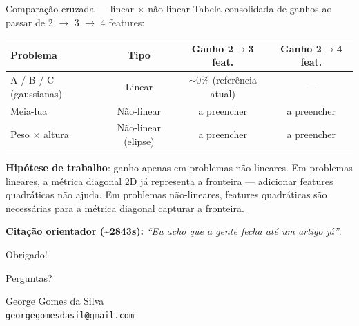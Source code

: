 \documentclass[aspectratio=169,10pt]{beamer}
\begin{document}
\begin{frame}{Compara\c{c}\~ao cruzada --- linear $\times$ n\~ao-linear}
  \footnotesize
  Tabela consolidada de ganhos ao passar de 2 $\to$ 3 $\to$ 4 features:
  \medskip

  \begin{center}
  \begin{tabular}{lccc}
    \toprule
    \textbf{Problema} & \textbf{Tipo} & \textbf{Ganho 2$\to$3 feat.} & \textbf{Ganho 2$\to$4 feat.} \\
    \midrule
    A / B / C (gaussianas) & Linear        & $\sim 0\%$ (refer\^encia atual) & --- \\
    Meia-lua               & N\~ao-linear  & a preencher                     & a preencher \\
    Peso $\times$ altura   & N\~ao-linear (elipse) & a preencher              & a preencher \\
    \bottomrule
  \end{tabular}
  \end{center}
  \medskip

  \textbf{Hip\'otese de trabalho}: ganho apenas em problemas n\~ao-lineares.
  Em problemas lineares, a m\'etrica diagonal 2D j\'a representa a fronteira
  --- adicionar features quadr\'aticas n\~ao ajuda. Em problemas n\~ao-lineares,
  features quadr\'aticas s\~ao necess\'arias para a m\'etrica diagonal capturar a fronteira.
  \medskip

  \textbf{Citação orientador (\textasciitilde2843s):} \emph{``Eu acho que a gente fecha at\'e um artigo j\'a''}.
\end{frame}

\begin{frame}
  \begin{center}
    \Huge Obrigado!
    \medskip

    \Large Perguntas?
    \vspace{2cm}

    \normalsize
    George Gomes da Silva \\
    \texttt{georgegomesdasil@gmail.com}
  \end{center}
\end{frame}
\end{document}
